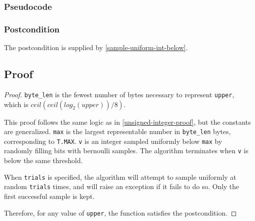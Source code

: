 \documentclass{article}
\begin{document}
\subsubsection*{Pseudocode}



\subsubsection*{Postcondition}
The postcondition is supplied by \ref{sample-uniform-int-below}.

\subsection{Proof}
\begin{proof} 

\texttt{byte\_len} is the fewest number of bytes necessary to represent \texttt{upper}, 
which is $ceil(ceil(log_2(upper)) / 8)$.

This proof follows the same logic as in \ref{unsigned-integer-proof},
but the constants are generalized.
\texttt{max} is the largest representable number in \texttt{byte\_len} bytes, corresponding to \texttt{T.MAX}.
\texttt{v} is an integer sampled uniformly below \texttt{max} by randomly filling bits with bernoulli samples.
The algorithm terminates when \texttt{v} is below the same threshold.

When \texttt{trials} is specified, the algorithm will attempt to sample uniformly at random \texttt{trials} times,
and will raise an exception if it fails to do so.
Only the first successful sample is kept.

\noindent Therefore, for any value of \texttt{upper}, the function satisfies the postcondition.
\end{proof}
\end{document}
